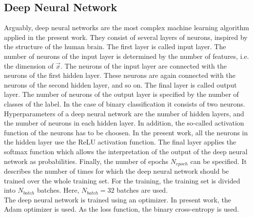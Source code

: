 \subsection{Deep Neural Network}
Arguably, deep neural networks are the most complex machine learning algorithm applied in the present work. They consist of several layers of neurons, inspired by the structure of the human brain. The first layer is called input layer. The number of neurons of the input layer is determined by the number of features, i.e. the dimension of $\vec{x}$. The neurons of the input layer are connected with the neurons of the first hidden layer. These neurons are again connected with the neurons of the second hidden layer, and so on. The final layer is called output layer. The number of neurons of the output layer is specified by the number of classes of the label. In the case of binary classification it consists of two neurons. \\

Hyperparameters of a deep neural network are the number of hidden layers, and the number of neurons in each hidden layer. In addition, the so-called activation function of the neurons has to be choosen. In the present work, all the neurons in the hidden layer use the ReLU activation function. The final layer applies the softmax function which allows the interpretation of the output of the deep neural network as probabilities. Finally, the number of epochs $N_{epoch}$ can be specified. It describes the number of times for which the deep neural network should be trained over the whole training set. For the training, the training set is divided into $N_{batch}$ batches. Here, $N_{batch} = 32$ batches are used. \\

The deep neural network is trained using an optimizer. In present work, the Adam optimizer is used. As the loss function, the binary cross-entropy is used.

